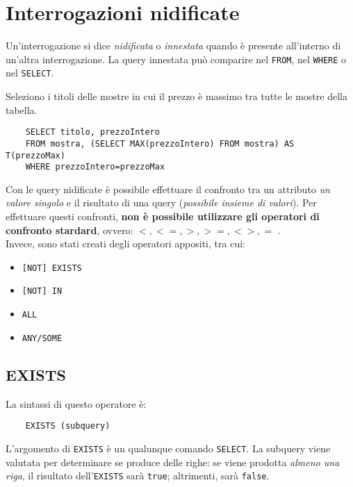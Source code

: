 \documentclass[12pt,a4paper]{book}
\begin{document}
	\section{Interrogazioni nidificate}
	Un'interrogazione si dice \textit{nidificata} o \textit{innestata} quando è presente all'interno di un'altra interrogazione. La query innestata può comparire nel \texttt{FROM}, nel \texttt{WHERE} o nel \texttt{SELECT}.\\
	\begin{tcolorbox}[enhanced jigsaw, breakable,title=Esempio, title filled]
	Seleziono i titoli delle mostre in cui il prezzo è massimo tra tutte le mostre della tabella.
	\begin{lstlisting}
	SELECT titolo, prezzoIntero
	FROM mostra, (SELECT MAX(prezzoIntero) FROM mostra) AS T(prezzoMax)
	WHERE prezzoIntero=prezzoMax
	\end{lstlisting}
	\end{tcolorbox}
	Con le query nidificate è possibile effettuare il confronto tra un attributo \textit{un valore singolo} e il risultato di una query (\textit{possibile insieme di valori}). Per effettuare questi confronti, \textbf{non è possibile utilizzare gli operatori di confronto stardard}, ovvero: $<, <=, >, >=, <>, =$ .\\
	Invece, sono stati creati degli operatori appositi, tra cui:
	\begin{itemize}
		\item \texttt{[NOT] EXISTS}
		\item \texttt{[NOT] IN}
		\item \texttt{ALL}
		\item \texttt{ANY/SOME}
	\end{itemize}
	\subsection{EXISTS}
	La sintassi di questo operatore è:
	\begin{lstlisting}
	EXISTS (subquery)
	\end{lstlisting}
	L'argomento di \texttt{EXISTS} è un qualunque comando \texttt{SELECT}. La subquery viene valutata per determinare se produce delle righe: se viene prodotta \textit{almeno una riga}, il risultato dell'\texttt{EXISTS} sarà \texttt{true}; altrimenti, sarà \texttt{false}.
\end{document}
